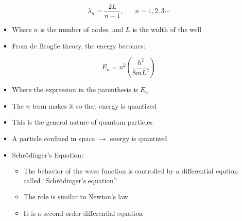 \begin{itemize}
    $$\lambda_n=\frac{2L}{n-1},\,\,\,\,\,\,\,\,\,\,n=1,2,3\cdots$$

  \item Where $n$ is the number of nodes, and $L$ is the width of the well

  \item From de Broglie theory, the energy becomes:

    $$E_n=n^2\left( \frac{h^2}{8mL^2} \right)$$

  \item Where the expression in the parenthesis is $E_o$

  \item The $n$ term makes it so that energy is quantized

  \item This is the general nature of quantum particles

  \item A particle confined in space $\to$ energy is quantized

  \item Schr\"odinger's Equation:

    \begin{itemize}

      \item The behavior of the wave function is controlled by a differential eqution called ``Schr\"odinger's equation''

      \item The role is similar to Newton's  law

      \item It is a second order differential equation

    \end{itemize}

\end{itemize}



